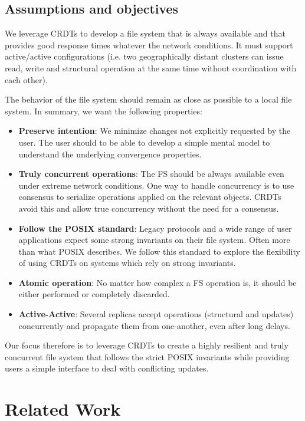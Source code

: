 \documentclass[sigconf, 10pt]{acmart}
\begin{document}
\subsection{Assumptions and objectives}

We leverage CRDTs to develop a file system that is always available
and that provides good response times whatever the network conditions.
It must support active/active configurations
(i.e. two geographically distant clusters can issue read, write and structural
operation at the same time without coordination with each other).

The behavior of the file system should remain as close as possible to a local file system.
In summary, we want the following properties:

\begin{itemize}
	\item \textbf{Preserve intention}: We minimize changes not explicitly requested by the user.
	The user should to be able to develop a simple mental model to understand
	the underlying convergence properties.
	\item \textbf{Truly concurrent operations}: The FS should be always available even under extreme network conditions.
	One way to handle concurrency
	is to use consensus to serialize operations applied on the relevant objects.
	CRDTs avoid this and allow true concurrency without the need for a consensus.
	\item \textbf{Follow the POSIX standard}: Legacy protocols and a wide range of user applications expect some strong invariants on their file system. Often more than what POSIX describes. We follow this standard to explore the flexibility of using CRDTs on systems which rely on strong invariants.
	\item \textbf{Atomic operation}: No matter how complex a FS operation is, it should be either performed or completely discarded.
	\item \textbf{Active-Active}: Several replicas accept operations
	(structural and updates) concurrently and propagate them from one-another,
	even after long delays.
\end{itemize}

Our focus therefore is to leverage CRDTs to create a highly resilient and
truly concurrent file system that follows the strict POSIX invariants
while providing users a simple interface to deal with conflicting updates.

\section{Related Work}
\end{document}
